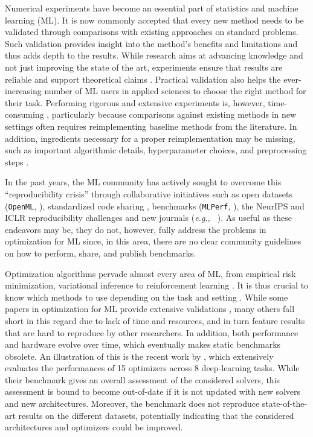 \documentclass{article}
\newcommand{\eg}{{\em e.g.,~}}
\newcommand{\OpenML}{\texttt{OpenML}}
\newcommand{\MLPerf}{\texttt{MLPerf}}
\begin{document}
  Numerical experiments have become an essential part of statistics and machine learning (ML).
It is now commonly accepted that every new method needs to be validated through comparisons with existing approaches on standard problems.
Such validation provides insight into the method's benefits and limitations and thus adds depth to the results.
While research aims at advancing knowledge and not just improving the state of the art, experiments ensure that results are reliable and support theoretical claims \citep{sculley2018winner}.
Practical validation also helps the ever-increasing number of ML users in applied sciences to choose the right method for their task.
Performing rigorous and extensive experiments is, however, time-consuming \citep{raff2019step}, particularly because comparisons against existing methods in new settings often requires reimplementing baseline methods from the literature.
In addition, ingredients necessary for a proper reimplementation may be missing, such as important algorithmic details, hyperparameter choices, and preprocessing steps \citep{pineau2019iclr}.





In the past years, the ML community has actively sought to overcome this ``reproducibility crisis'' \citep{hutson2018reproducibility} through collaborative initiatives such as open datasets (\OpenML{}, \citealt{OpenML2013}), standardized code sharing \citep{forde2018reproducible}, benchmarks (\MLPerf{}, \citealt{mattson2020mlperf}), the NeurIPS and ICLR reproducibility challenges \citep{pineau2019iclr,pineau2021improving} and new journals (\eg{} \citealt{rougier2018rescience}).
As useful as these endeavors may be, they do not, however, fully address the problems in optimization for ML since, in this area, there are no clear community guidelines on how to perform, share, and publish benchmarks.


Optimization algorithms pervade almost every area of ML, from empirical risk minimization, variational inference to reinforcement learning \citep{sra2012optimization}.
It is thus crucial to know which methods to use depending on the task and setting \citep{bartz2020benchmarking}.
While some papers in optimization for ML provide extensive validations \citep{Lueckmann2021}, many others fall short in this regard due to lack of time and resources, and in turn feature results that are hard to reproduce by other researchers. In addition, both performance and hardware evolve over time, which eventually makes static benchmarks obsolete.
An illustration of this is the recent work by \citet{Schmidt2021}, which extensively evaluates the performances of 15 optimizers across 8 deep-learning tasks.
While their benchmark gives an overall assessment of the considered solvers, this assessment is bound to become out-of-date if it is not updated with new solvers and new architectures.
Moreover, the benchmark does not reproduce state-of-the-art results on the different datasets, potentially indicating that the considered architectures and optimizers could be improved.
\end{document}

